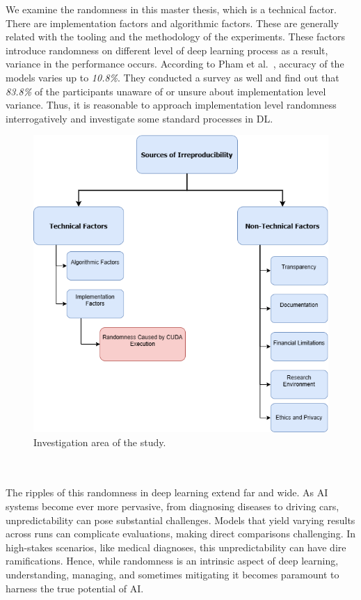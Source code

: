 We examine the randomness in this master thesis, which is a technical factor. There are implementation factors and algorithmic factors. These are generally
related with the tooling and the methodology of the experiments. These factors introduce randomness on different level of deep learning process
as a result, variance in the performance occurs. According to Pham et al.~\cite{pham2020problems}, accuracy of the models varies up to \emph{10.8\%}. They conducted a survey as well and
find out that \emph{83.8\%} of the participants unaware of or unsure about implementation level variance. 
Thus, it is reasonable to approach implementation level randomness interrogatively and investigate some standard processes in DL. 
\begin{figure}[htbp]
    \centerline{\includegraphics[scale=.5]{figures/Sources.png}}
    \caption{Investigation area of the study.}
    \label{fig:sources}
    \end{figure}
\\
\\
The ripples of this randomness in deep learning extend far and wide. As AI systems become ever more pervasive, from diagnosing diseases to driving cars, unpredictability can pose substantial challenges. Models that yield varying results across runs can complicate evaluations, making direct comparisons challenging. In high-stakes scenarios, like medical diagnoses, this unpredictability can have dire ramifications. Hence, while randomness is an intrinsic aspect of deep learning, understanding, managing, and sometimes mitigating it becomes paramount to harness the true potential of AI.\\
\\

